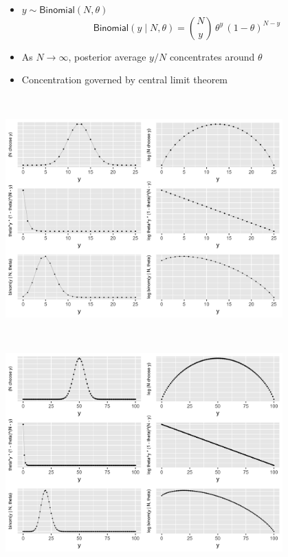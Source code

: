 \documentclass[10pt]{report}
\begin{document}
%
\begin{itemize}
\item $y \sim \mathsf{Binomial}(N, \theta)$
\[
\mathsf{Binomial}(y \mid N, \theta)
= \binom{N}{y} \, \theta^y \, (1 - \theta)^{N - y}
\]
\item As $N \rightarrow \infty$, posterior average $y / N$
  concentrates around $\theta$
\item Concentration governed by central limit theorem
\end{itemize}

%
\\[-12pt]
\begin{center}
\includegraphics[width=0.8\textwidth]{img/binomial-concentration-25.png}
\end{center}

%
\\[-12pt]
\begin{center}
\includegraphics[width=0.8\textwidth]{img/binomial-concentration-100.png}
\end{center}
\end{document}
